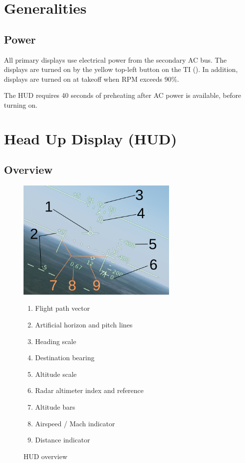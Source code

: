 \section{Generalities}
\subsection{Power}
All primary displays use electrical power from the secondary AC bus.
The displays are turned on by the yellow top-left button on the TI
().
In addition, displays are turned on at takeoff when RPM exceeds 90\%.

The HUD requires 40 seconds of preheating after AC power is available, before turning on.

\section{Head Up Display (HUD)}
\subsection{Overview}
\begin{figure}[!ht]
  \centering
  \includegraphics[width=0.7\textwidth]{images/displays/ja-hud-general.png}

  \begin{multicols}{2}
    \begin{enumerate}[nosep]
      \item \label{item:fpv} Flight path vector
      \item \label{item:horizon} Artificial horizon and pitch lines
      \item \label{item:heading} Heading scale
      \item \label{item:dest} Destination bearing
      \item \label{item:altitude} Altitude scale
      \item \label{item:rhm} Radar altimeter index and reference
      \item \label{item:altbars} Altitude bars
      \item \label{item:speed} Airspeed / Mach indicator
      \item \label{item:distance} Distance indicator
    \end{enumerate}
  \end{multicols}

  \caption{HUD overview}
  \label{fig:hud}
\end{figure}

